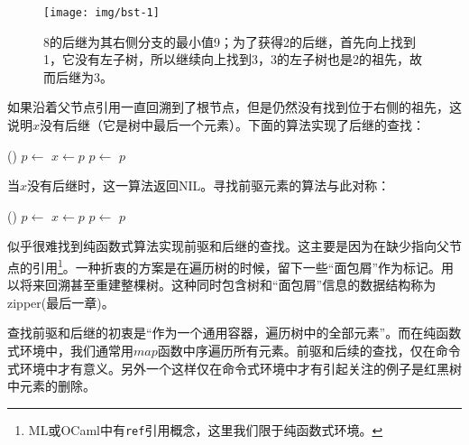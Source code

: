 \documentclass[b5paper]{ctexart}
\begin{document}
\begin{figure}[htbp]
  \centering
  \texttt{[image: img/bst-1]}
  \caption{8的后继为其右侧分支的最小值9；为了获得2的后继，首先向上找到1，它没有左子树，所以继续向上找到3，3的左子树也是2的祖先，故而后继为3。} \label{fig:bst-succ}
\end{figure}

如果沿着父节点引用一直回溯到了根节点，但是仍然没有找到位于右侧的祖先，这说明$x$没有后继（它是树中最后一个元素）。下面的算法实现了后继的查找：

\begin{algorithmic}[1]
    \State \Return {}()
  \Else
    \State $p \gets $ 
      \State $x \gets p$
      \State $p \gets $ 
    \EndWhile
    \State \Return $p$
  \EndIf
\EndFunction
\end{algorithmic}

当$x$没有后继时，这一算法返回NIL。寻找前驱元素的算法与此对称：

\begin{algorithmic}[1]
    \State \Return {}()
  \Else
    \State $p \gets $ 
      \State $x \gets p$
      \State $p \gets $ 
    \EndWhile
    \State \Return $p$
  \EndIf
\EndFunction
\end{algorithmic}

似乎很难找到纯函数式算法实现前驱和后继的查找。这主要是因为在缺少指向父节点的引用\footnote{ML或OCaml中有\texttt{ref}引用概念，这里我们限于纯函数式环境。}。一种折衷的方案是在遍历树的时候，留下一些“面包屑”作为标记。用以将来回溯甚至重建整棵树。这种同时包含树和“面包屑”信息的数据结构称为zipper(\cite{learn-haskell}最后一章)。

查找前驱和后继的初衷是“作为一个通用容器，遍历树中的全部元素”。而在纯函数式环境中，我们通常用$map$函数中序遍历所有元素。前驱和后续的查找，仅在命令式环境中才有意义。另外一个这样仅在命令式环境中才有引起关注的例子是红黑树中元素的删除\cite{okasaki-blog}。

\begin{Exercise}


\end{Exercise}
\end{document}

